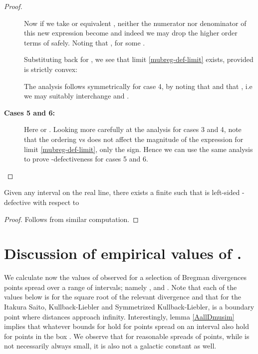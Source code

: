 \documentclass[11pt]{myclass}
\begin{document}
\begin{proof}
\begin{description}
Now if we take  or equivalent , neither the numerator nor denominator of this
new expression become  and indeed we may drop the higher order terms of  safely.  Noting that , for some . 


Substituting back  for , we see that limit \ref{mubreg-def-limit} exists, provided  is strictly convex:



The analysis follows symmetrically for case 4, by noting that  and that , i.e we may suitably interchange  and .

\item[\textbf{Cases 5 and 6:}]
Here  or . Looking more carefully at the analysis for cases 3 and 4, note that the ordering  vs  does not affect the magnitude of the expression for limit  \ref{mubreg-def-limit}, only the sign. Hence we can use the same analysis to prove -defectiveness for cases 5 and 6.
\qedhere
\end{description}
\end{proof}

\begin{corollary}
 Given any interval  on the real line, there exists a finite 
 such that   is left-sided -defective with respect to  
\end{corollary}

\begin{proof}
Follows from similar computation. 
\end{proof}


\section{Discussion of empirical values of .}
\label{sec:muranges}
We calculate now the values of  observed for a selection of Bregman divergences points spread over a range of intervals; namely ,  and
.   Note that each of the values below is for the square root of the relevant divergence and that for the
Itakura Saito, Kullback-Liebler and Symmetrized Kullback-Liebler,  is a boundary point where distances approach infinity. 
Interestingly, lemma \ref{AallDmusim} implies that whatever bounds for  hold for points spread on an interval  also hold for points in the box . We observe that for reasonable spreads of points,
while  is not necessarily always small, it is also not a galactic constant as well.
\end{document}
